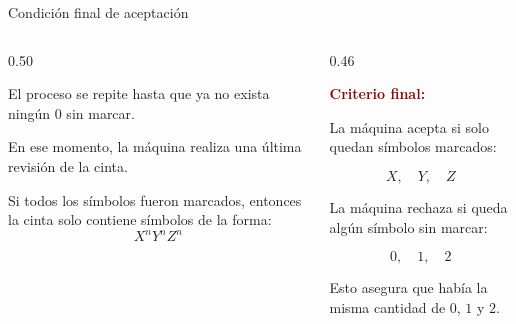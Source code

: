 \documentclass[aspectratio=1610, 12pt]{beamer}
\begin{document}
\begin{frame}[t]{Condición final de aceptación}
\vspace{4pt}
\begin{columns}[T]

  \begin{column}{0.50\textwidth}
    \begin{defbox}
      \footnotesize
      El proceso se repite hasta que ya no exista ningún $0$
      sin marcar.

      \vspace{4pt}
      En ese momento, la máquina realiza una última revisión
      de la cinta.

      \vspace{4pt}
      Si todos los símbolos fueron marcados, entonces la cinta
      solo contiene símbolos de la forma:
      \[
        X^nY^nZ^n
      \]
    \end{defbox}
  \end{column}

  \begin{column}{0.46\textwidth}
    \begin{alertbox}
      \small
      \textcolor{DarkRed}{\textbf{Criterio final:}}

      \vspace{4pt}
      La máquina acepta si solo quedan símbolos marcados:

      \[
        X,\quad Y,\quad Z
      \]

      \vspace{4pt}
      La máquina rechaza si queda algún símbolo sin marcar:

      \[
        0,\quad 1,\quad 2
      \]

      \vspace{4pt}
      Esto asegura que había la misma cantidad de $0$, $1$ y $2$.
    \end{alertbox}
  \end{column}

\end{columns}
\end{frame}
\end{document}
